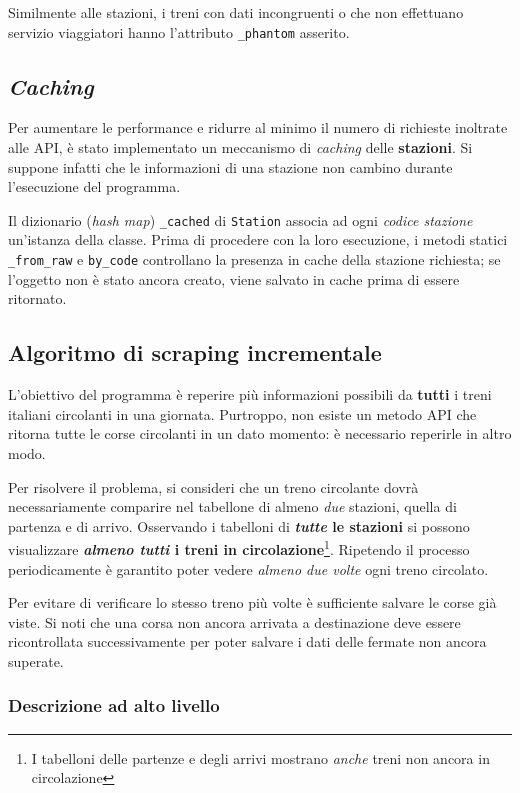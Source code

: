 \documentclass[12pt,italian]{report}
\begin{document}
Similmente alle stazioni, i treni con dati incongruenti o che non
effettuano servizio viaggiatori hanno l'attributo \texttt{\_phantom}
asserito.

\subsection{\textit{Caching}}

Per aumentare le performance e ridurre al minimo il numero di
richieste inoltrate alle API, è stato implementato un meccanismo di
\textit{caching} delle \textbf{stazioni}.  Si suppone infatti che le
informazioni di una stazione non cambino durante l'esecuzione del
programma.

Il dizionario (\textit{hash map}) \texttt{\_cached} di
\texttt{Station} associa ad ogni \textit{codice stazione} un'istanza
della classe.  Prima di procedere con la loro esecuzione, i metodi
statici \texttt{\_from\_raw} e \texttt{by\_code} controllano la
presenza in cache della stazione richiesta; se l'oggetto non è stato
ancora creato, viene salvato in cache prima di essere ritornato.

\subsection{Algoritmo di scraping incrementale}

L'obiettivo del programma è reperire più informazioni possibili da
\textbf{tutti} i treni italiani circolanti in una giornata.
Purtroppo, non esiste un metodo API che ritorna tutte le corse
circolanti in un dato momento: è necessario reperirle in altro modo.

Per risolvere il problema, si consideri che un treno circolante dovrà
necessariamente comparire nel tabellone di almeno \textit{due}
stazioni, quella di partenza e di arrivo.  Osservando i tabelloni di
\textbf{\textit{tutte} le stazioni} si possono visualizzare
\textbf{\textit{almeno tutti} i treni in circolazione}\footnote{I
    tabelloni delle partenze e degli arrivi mostrano \textit{anche}
    treni non ancora in circolazione}.  Ripetendo il processo
periodicamente è garantito poter vedere \textit{almeno due volte} ogni
treno circolato.

Per evitare di verificare lo stesso treno più volte è sufficiente
salvare le corse già viste.  Si noti che una corsa non ancora arrivata
a destinazione deve essere ricontrollata successivamente per poter
salvare i dati delle fermate non ancora superate.

\subsubsection{Descrizione ad alto livello}
\end{document}
